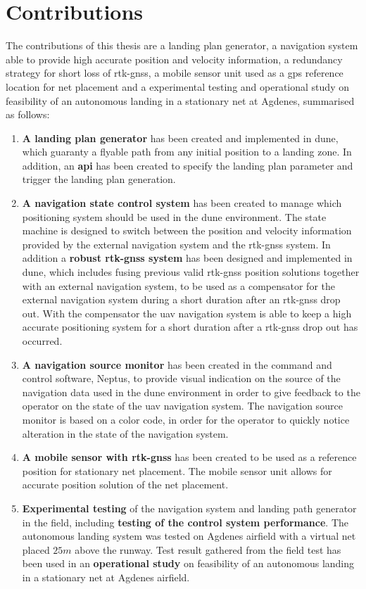 \section{Contributions}
The contributions of this thesis are a landing plan generator, a navigation system able to provide high accurate position and velocity information, a redundancy strategy for short loss of \gls{rtk-gnss}, a mobile sensor unit used as a \gls{gps} reference location for net placement and a experimental testing and operational study on feasibility of an autonomous landing in a stationary net at Agdenes, summarised as follows:
\begin{enumerate}
\item \textbf{A landing plan generator} has been created and implemented in \gls{dune}, which guaranty a flyable path from any initial position to a landing zone. In addition, an \textbf{\acrfull{api}} has been created to specify the landing plan parameter and trigger the landing plan generation.
\item \textbf{A navigation state control system} has been created to manage which positioning system should be used in the \gls{dune} environment. The state machine is designed to switch between the position and velocity information provided by the external navigation system and the \gls{rtk-gnss} system. In addition a \textbf{robust \gls{rtk-gnss} system} has been designed and implemented in \gls{dune}, which includes fusing previous valid \gls{rtk-gnss} position solutions together with an external navigation system, to be used as a compensator for the external navigation system during a short duration after an \gls{rtk-gnss} drop out. With the compensator the \gls{uav} navigation system is able to keep a high accurate positioning system for a short duration after a \gls{rtk-gnss} drop out has occurred.
\item \textbf{A navigation source monitor} has been created in the command and control software, Neptus, to provide visual indication on the source of the navigation data used in the \gls{dune} environment in order to give feedback to the operator on the state of the \gls{uav} navigation system. The navigation source monitor is based on a color code, in order for the operator to quickly notice alteration in the state of the navigation system.
\item \textbf{A mobile sensor with \gls{rtk-gnss}} has been created to be used as a reference position for stationary net placement. The mobile sensor unit allows for accurate position solution of the net placement.
\item \textbf{Experimental testing} of the navigation system and landing path generator in the field, including \textbf{testing of the control system performance}. The autonomous landing system was tested on Agdenes airfield with a virtual net placed $25 m$ above the runway. Test result gathered from the field test has been used in an \textbf{operational study} on feasibility of an autonomous landing in a stationary net at Agdenes airfield.
\end{enumerate}
